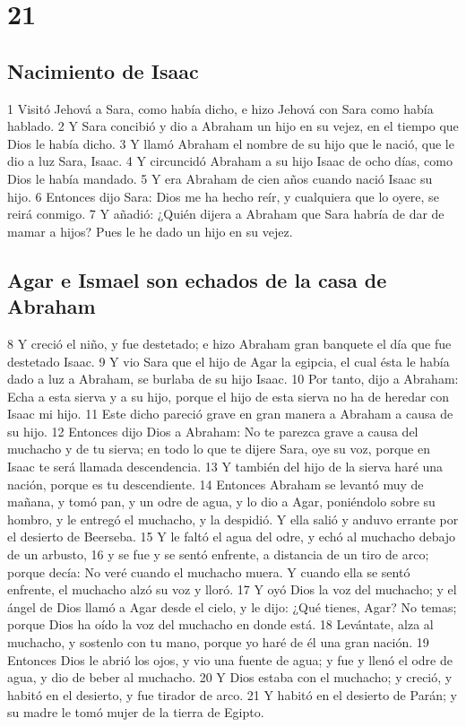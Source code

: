 \chapter{21}

\section*{Nacimiento de Isaac}

1 Visitó Jehová a Sara, como había dicho, e hizo Jehová con Sara como había hablado.
2 Y Sara concibió y dio a Abraham un hijo en su vejez, en el tiempo que Dios le había dicho.
3 Y llamó Abraham el nombre de su hijo que le nació, que le dio a luz Sara, Isaac.
4 Y circuncidó Abraham a su hijo Isaac de ocho días, como Dios le había mandado.
5 Y era Abraham de cien años cuando nació Isaac su hijo.
6 Entonces dijo Sara: Dios me ha hecho reír, y cualquiera que lo oyere, se reirá conmigo.
7 Y añadió: ¿Quién dijera a Abraham que Sara habría de dar de mamar a hijos? Pues le he dado un hijo en su vejez.

\section*{Agar e Ismael son echados de la casa de Abraham}

8 Y creció el niño, y fue destetado; e hizo Abraham gran banquete el día que fue destetado Isaac.
9 Y vio Sara que el hijo de Agar la egipcia, el cual ésta le había dado a luz a Abraham, se burlaba de su hijo Isaac.
10 Por tanto, dijo a Abraham: Echa a esta sierva y a su hijo, porque el hijo de esta sierva no ha de heredar con Isaac mi hijo.
11 Este dicho pareció grave en gran manera a Abraham a causa de su hijo.
12 Entonces dijo Dios a Abraham: No te parezca grave a causa del muchacho y de tu sierva; en todo lo que te dijere Sara, oye su voz, porque en Isaac te será llamada descendencia.
13 Y también del hijo de la sierva haré una nación, porque es tu descendiente.
14 Entonces Abraham se levantó muy de mañana, y tomó pan, y un odre de agua, y lo dio a Agar, poniéndolo sobre su hombro, y le entregó el muchacho, y la despidió. Y ella salió y anduvo errante por el desierto de Beerseba.
15 Y le faltó el agua del odre, y echó al muchacho debajo de un arbusto,
16 y se fue y se sentó enfrente, a distancia de un tiro de arco; porque decía: No veré cuando el muchacho muera. Y cuando ella se sentó enfrente, el muchacho alzó su voz y lloró.
17 Y oyó Dios la voz del muchacho; y el ángel de Dios llamó a Agar desde el cielo, y le dijo: ¿Qué tienes, Agar? No temas; porque Dios ha oído la voz del muchacho en donde está.
18 Levántate, alza al muchacho, y sostenlo con tu mano, porque yo haré de él una gran nación.
19 Entonces Dios le abrió los ojos, y vio una fuente de agua; y fue y llenó el odre de agua, y dio de beber al muchacho.
20 Y Dios estaba con el muchacho; y creció, y habitó en el desierto, y fue tirador de arco.
21 Y habitó en el desierto de Parán; y su madre le tomó mujer de la tierra de Egipto.

